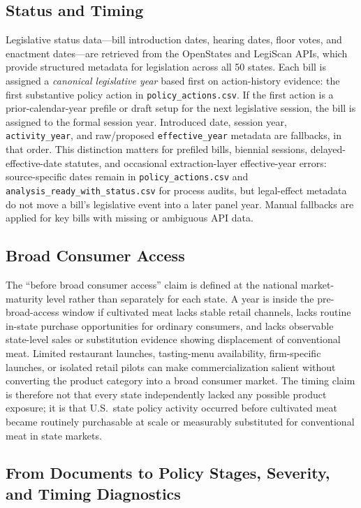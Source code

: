 \documentclass[12pt]{article}
\begin{document}
\subsection{Status and Timing}

Legislative status data---bill introduction dates, hearing dates, floor votes, and enactment dates---are retrieved from the OpenStates and LegiScan APIs, which provide structured metadata for legislation across all 50 states.  Each bill is assigned a \emph{canonical legislative year} based first on action-history evidence: the first substantive policy action in \texttt{policy\_actions.csv}.  If the first action is a prior-calendar-year prefile or draft setup for the next legislative session, the bill is assigned to the formal session year.  Introduced date, session year, \texttt{activity\_year}, and raw/proposed \texttt{effective\_year} metadata are fallbacks, in that order.  This distinction matters for prefiled bills, biennial sessions, delayed-effective-date statutes, and occasional extraction-layer effective-year errors: source-specific dates remain in \texttt{policy\_actions.csv} and \texttt{analysis\_ready\_with\_status.csv} for process audits, but legal-effect metadata do not move a bill's legislative event into a later panel year.  Manual fallbacks are applied for key bills with missing or ambiguous API data.

\subsection{Broad Consumer Access}

The ``before broad consumer access'' claim is defined at the national market-maturity level rather than separately for each state.  A year is inside the pre-broad-access window if cultivated meat lacks stable retail channels, lacks routine in-state purchase opportunities for ordinary consumers, and lacks observable state-level sales or substitution evidence showing displacement of conventional meat.  Limited restaurant launches, tasting-menu availability, firm-specific launches, or isolated retail pilots can make commercialization salient without converting the product category into a broad consumer market.  The timing claim is therefore not that every state independently lacked any possible product exposure; it is that U.S.\ state policy activity occurred before cultivated meat became routinely purchasable at scale or measurably substituted for conventional meat in state markets.

\subsection{From Documents to Policy Stages, Severity, and Timing Diagnostics}
\end{document}
